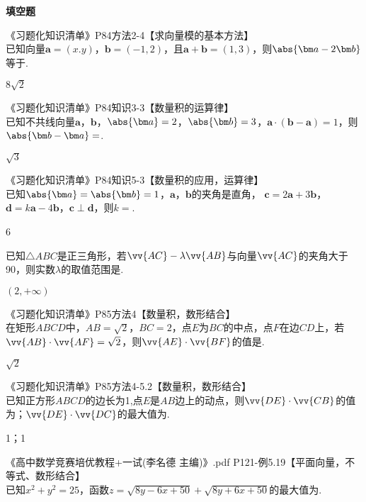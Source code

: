 \begin{exercise}{\bf 填空题}
\begin{answer}
      \end{answer}
    \item 《习题化知识清单》P84方法2-4【求向量模的基本方法】\\
      已知向量$\bm a=(x.y)$，$\bm b=(-1,2)$，且$\bm a+\bm b=(1,3)$，则$\abs{\bm a-2\bm b}$等于\tk.
      \begin{answer}
        $8\sqrt{2}$
      \end{answer}
    \item 《习题化知识清单》P84知识3-3【数量积的运算律】\\
      已知不共线向量$\bm a$，$\bm b$，$\abs{\bm a}=2$，$\abs{\bm b}=3$，$\bm a\cdot(\bm b-\bm a)=1$，则$\abs{\bm b-\bm a}=$\tk.
      \begin{answer}
        $\sqrt{3}$
      \end{answer}
    \item 《习题化知识清单》P84知识5-3【数量积的应用，运算律】\\
      已知$\abs{\bm a}=\abs{\bm b}=1$，$\bm a$，$\bm b$的夹角是直角，
      $\bm c=2\bm a+3\bm b$，$\bm d=k\bm a-4\bm b$，$\bm c\perp\bm d$，则$k=$\tk.
      \begin{answer}
        6
      \end{answer}
      已知$\triangle{ABC}$是正三角形，若$\vv{AC}-\lambda\vv{AB}$与向量$\vv{AC}$的夹角大于90\degree，则实数$\lambda$的取值范围是\tk.
      \begin{answer}
        $(2,+\infty)$
      \end{answer}
    \item 《习题化知识清单》P85方法4【数量积，数形结合】\\
      在矩形$ABCD$中，$AB=\sqrt{2}$，$BC=2$，点$E$为$BC$的中点，点$F$在边$CD$上，若$\vv{AB}\cdot\vv{AF}=\sqrt{2}$，则$\vv{AE}\cdot\vv{BF}$的值是\tk.
      \begin{answer}
        $\sqrt{2}$
      \end{answer}
    \item 《习题化知识清单》P85方法4-5.2【数量积，数形结合】\\
      已知正方形$ABCD$的边长为1,点$E$是$AB$边上的动点，则$\vv{DE}\cdot\vv{CB}$的值为\tk；$\vv{DE}\cdot\vv{DC}$的最大值为\tk.
      \begin{answer}
        1；1
      \end{answer}
    \item 《高中数学竞赛培优教程+一试(李名德 主编)》.pdf P121-例5.19【平面向量，不等式、数形结合】\\
      已知$x^2+y^2=25$，函数$z=\sqrt{8y-6x+50}+\sqrt{8y+6x+50}$的最大值为\tk.

\end{exercise}
